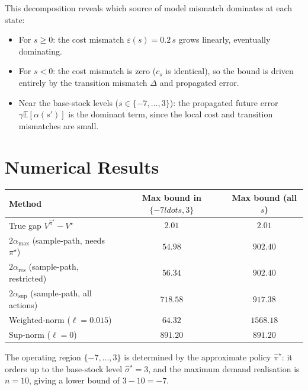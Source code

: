\documentclass[11pt]{article}
\newcommand{\pistar}{\pi^\star}
\newcommand{\pihatstar}{\hat\pi^\star}
\newcommand{\Vstar}{V^\star}
\newcommand{\Vpihat}{V^{\pihatstar}}
\newcommand{\alphares}{\alpha_{\mathrm{res}}}
\begin{document}
This decomposition reveals which source of model mismatch dominates at each
state:
\begin{itemize}
  \item For $s \ge 0$: the cost mismatch $\varepsilon(s) = 0.2\,s$ grows
        linearly, eventually dominating.
  \item For $s < 0$: the cost mismatch is zero ($c_s$ is identical), so the
        bound is driven entirely by the transition mismatch $\Delta$ and
        propagated error.
  \item Near the base-stock levels ($s \in \{-7, \ldots, 3\}$): the propagated
        future error $\gamma \mathbb{E}[\alpha(s')]$ is the dominant term, since
        the local cost and transition mismatches are small.
\end{itemize}

\section{Numerical Results}

\begin{center}
\begin{tabular}{lcc}
\toprule
Method & Max bound in $\{-7 ldots,3\}$ & Max bound (all $s$) \\
\midrule
True gap $\Vpihat - \Vstar$ & $2.01$ & $2.01$ \\
$2\alpha_{\max}$ (sample-path, needs $\pistar$) & $54.98$ & $902.40$ \\
$2\alphares$ (sample-path, restricted) & $56.34$ & $902.40$ \\
$2\alpha_{\sup}$ (sample-path, all actions) & $718.58$ & $917.38$ \\
Weighted-norm ($\ell = 0.015$) & $64.32$ & $1568.18$ \\
Sup-norm ($\ell = 0$) & $891.20$ & $891.20$ \\
\bottomrule
\end{tabular}
\end{center}

The operating region $\{-7, \ldots, 3\}$ is determined by the approximate policy
$\pihatstar$: it orders up to the base-stock level $\hat\sigma^\star = 3$, and the
maximum demand realisation is $n = 10$, giving a lower bound of $3 - 10 = -7$.
\end{document}
